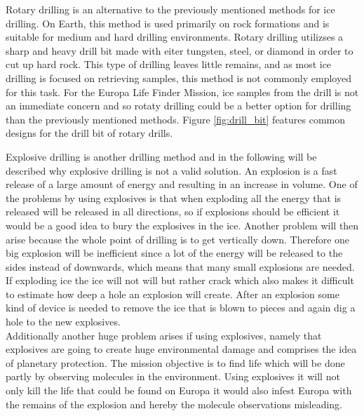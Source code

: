 Rotary drilling is an alternative to the previously mentioned methods for ice drilling. On Earth, this method is used primarily on rock formations and is suitable for medium and hard drilling environments. Rotary drilling utilizses a sharp and heavy drill bit made with eiter tungsten, steel, or diamond in order to cut up hard rock. This type of drilling leaves little remains, and as most ice drilling is focused on retrieving samples, this method is not commonly employed for this task. For the Europa Life Finder Mission, ice samples from the drill is not an immediate concern and so rotaty drilling could be a better option for drilling than the previously mentioned methods. Figure \ref{fig:drill_bit} features common designs for the drill bit of rotary drills.

Explosive drilling is another drilling method and in the following will be described why explosive drilling is not a valid solution. An explosion is a fast release of a large amount of energy and resulting in an increase in volume. One of the problems by using explosives is that when exploding all the energy that is released will be released in all directions, so if explosions should be efficient it would be a good idea to bury the explosives in the ice. Another problem will then arise because the whole point of drilling is to get vertically down. Therefore one big explosion will be inefficient since a lot of the energy will be released to the sides instead of downwards, which means that many small explosions are needed. If exploding ice the ice will not will but rather crack which also makes it difficult to estimate how deep a hole an explosion will create. After an explosion some kind of device is needed to remove the ice that is blown to pieces and again dig a hole to the new explosives. \\

\noindent
Additionally another huge problem arises if using explosives, namely that explosives are going to create huge environmental damage and comprises the idea of planetary protection. The mission objective is to find life which will be done partly by observing molecules in the environment. Using explosives it will not only kill the life that could be found on Europa it would also infest Europa with the remains of the explosion and hereby the molecule observations misleading.\\

